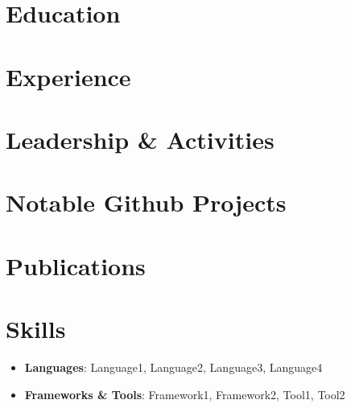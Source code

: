 \documentclass[default,publications,apa]{resume}
\begin{document}
\titlesection
\profileSummary
\updated{\today}

\section{Education}
\begin{resumeSection}
\end{resumeSection}

\section{Experience}
\begin{resumeSection}
\end{resumeSection}

\section{Leadership \& Activities}
\begin{resumeSection}
\end{resumeSection}

\section{Notable Github Projects}
\begin{resumeSection}
\end{resumeSection}

\makeatletter\if@publications\makeatother
\section{Publications}
\begin{resumeSection}
	\item
	\renderPublications
\end{resumeSection}
\makeatletter\fi\makeatother

\section{Skills}
\begin{itemize}[itemsep=2pt, parsep=0pt, topsep=2pt, partopsep=0pt, leftmargin=0.0in, label={}]
	\item \textbf{Languages}: Language1, Language2, Language3, Language4
	\item \textbf{Frameworks \& Tools}: Framework1, Framework2, Tool1, Tool2
\end{itemize}
\end{document}
